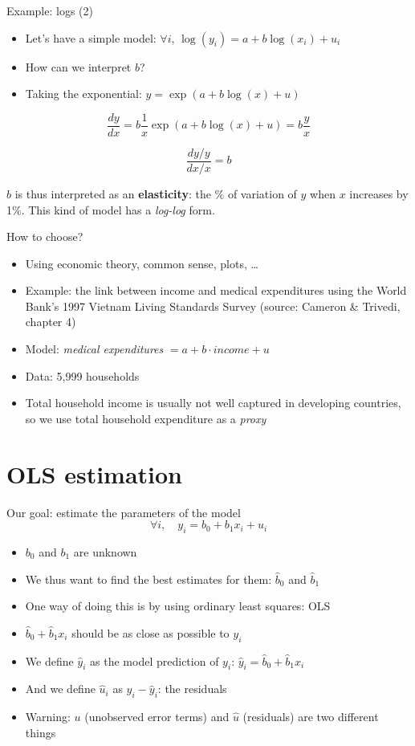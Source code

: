 \documentclass[aspectratio=169]{beamer}
\begin{document}
\begin{frame}{Example: logs (2)}
\begin{itemize}
    \item Let's have a simple model: $\forall i$, $\log(y_i) = a + b\log(x_i) + u_i$
    \item How can we interpret $b$?
    \item Taking the exponential: $y = \exp(a + b\log(x) + u)$
\end{itemize}

\[\frac{dy}{dx} = b\frac{1}{x}\exp(a + b\log(x) + u) = b\frac{y}{x}\]

\[\frac{dy/y}{dx/x} = b\]

$b$ is thus interpreted as an \textbf{elasticity}: the \% of variation of $y$ when $x$ increases by 1\%. This kind of model has a \textit{log-log} form.
\end{frame}

\begin{frame}{How to choose?}
\begin{itemize}
    \item Using economic theory, common sense, plots, \dots
    \item Example: the link between income and medical expenditures using the World Bank's 1997 Vietnam Living Standards Survey (source: Cameron \& Trivedi, chapter 4)
    \item Model: \textit{medical expenditures} $= a + b \cdot \textit{income} + u$
    \item Data: 5,999 households
    \item Total household income is usually not well captured in developing countries, so we use total household expenditure as a \textit{proxy}
\end{itemize}
\end{frame}

\section{OLS estimation}

\begin{frame}{Our goal: estimate the parameters of the model}
\[\forall i, \quad y_i = b_0 + b_1x_i + u_i\]

\begin{itemize}
    \item $b_0$ and $b_1$ are unknown
    \item We thus want to find the best estimates for them: $\hat{b}_0$ and $\hat{b}_1$
    \item One way of doing this is by using ordinary least squares: OLS
    \item $\hat{b}_0 + \hat{b}_1x_i$ should be as close as possible to $y_i$
    \item We define $\hat{y}_i$ as the model prediction of $y_i$: $\hat{y}_i = \hat{b}_0 + \hat{b}_1x_i$
    \item And we define $\hat{u}_i$ as $y_i - \hat{y}_i$: the residuals
    \item Warning: $u$ (unobserved error terms) and $\hat{u}$ (residuals) are two different things
\end{itemize}
\end{frame}
\end{document}
